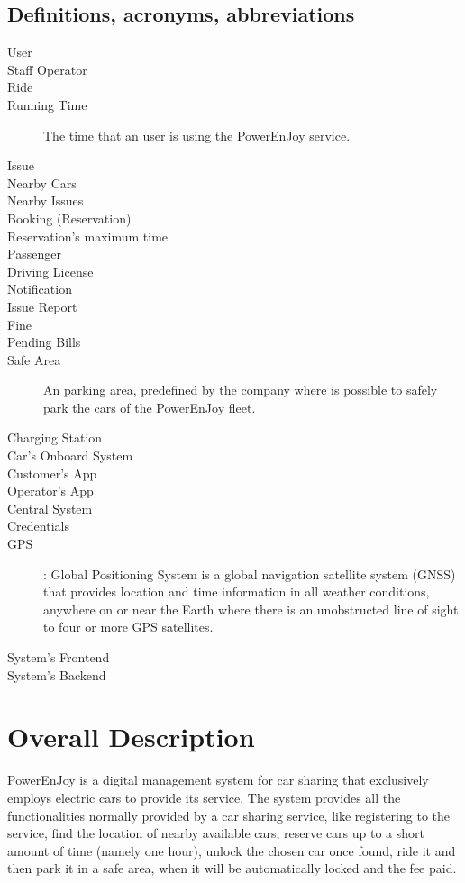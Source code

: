 \documentclass[11pt]{article} %
\newcommand{\pe}{PowerEnJoy }
\begin{document}
\subsection{Definitions, acronyms, abbreviations}
  \begin{description}
	\item[User]
	\item[Staff Operator]
	\item[Ride]
  	\item[Running Time] The time that an user is using the \pe service.
	\item[Issue]
	\item[Nearby Cars]
	\item[Nearby Issues]
	\item[Booking (Reservation)]
	\item[Reservation's maximum time]
	\item[Passenger]
	\item[Driving License]
	\item[Notification]
	\item[Issue Report]
	\item[Fine]
	\item[Pending Bills]
	\item[Safe Area] An parking area, predefined by the company where is possible to safely park the cars of the \pe fleet.
	\item[Charging Station]
	\item[Car's Onboard System]
	\item[Customer's App]
	\item[Operator's App]
	\item[Central System]
	\item[Credentials]
  	\item[GPS]: Global Positioning System is a global navigation satellite system (GNSS) that provides location and time information in all weather conditions, anywhere on or near the Earth where there is an unobstructed line of sight to four or more GPS satellites.
  	\item[System's Frontend]
  	\item[System's Backend]
  \end{description}

\section{Overall Description}

\pe is a digital management system for car sharing that exclusively employs electric cars to provide its service. The system provides all the functionalities normally provided by a car sharing service, like registering to the service, find the location of nearby available cars, reserve cars up to a short amount of time (namely one hour), unlock the chosen car once found, ride it and then park it in a safe area, when it will be automatically locked and the fee paid.
\end{document}
